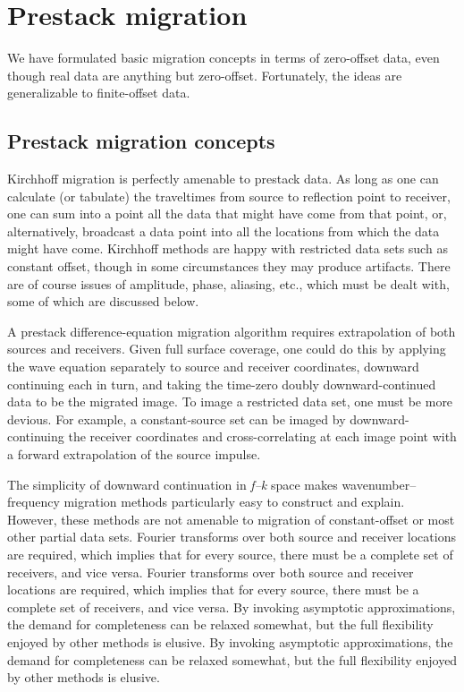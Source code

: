 
\chapter{Prestack migration}

We have formulated basic migration concepts in terms of zero-offset data, even though real data are anything but zero-offset. Fortunately, the ideas are generalizable to finite-offset data.

\section{Prestack migration concepts}

Kirchhoff migration is perfectly amenable to prestack data. As long as one can calculate (or tabulate) the traveltimes from source to reflection
point to receiver, one can sum into a point all the data that might have come from that point, or, alternatively, broadcast a data point into all
the locations from which the data might have come. Kirchhoff methods are happy with restricted data sets such as constant offset, though in some
circumstances they may produce artifacts. There are of course issues of amplitude, phase, aliasing, etc., which must be dealt with, some of which are discussed below.

\begin{examples}
A prestack difference-equation migration algorithm requires extrapolation of both sources and receivers. Given full surface coverage, one could
do this by applying the wave equation separately to source and receiver coordinates, downward continuing each in turn, and taking the time-zero doubly
downward-continued data to be the migrated image. To image a restricted data set, one must be more devious. For example, a constant-source
set can be imaged by downward-continuing the receiver coordinates and cross-correlating at each image point with a forward extrapolation of the source
impulse.
\end{examples}

The simplicity of downward continuation in \textit{f--k} space makes wavenumber--frequency migration methods particularly easy to construct and explain.
However, these methods are not amenable to migration of constant-offset or most other partial data sets. Fourier transforms over both source
and receiver locations are required, which implies that for every source, there must be a complete set of receivers, and vice versa. Fourier transforms over both source
and receiver locations are required, which implies that for every source, there must be a complete set of receivers, and vice versa. By invoking
asymptotic approximations, the demand for completeness can be relaxed somewhat, but the full flexibility enjoyed by other methods is elusive. By invoking
asymptotic approximations, the demand for completeness can be relaxed somewhat, but the full flexibility enjoyed by other methods is elusive.

